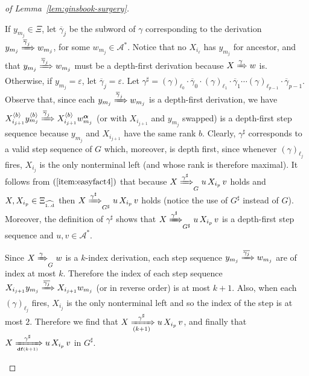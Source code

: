 \documentclass[final]{llncs}
\def\tuple#1{{\langle #1 \rangle}}
\def\df#1{\scriptscriptstyle\mathbf{df}(#1)}
\def\Vars{\ensuremath{\Xi}}
\def\Varse{\ensuremath{\Xi_{\widehat{\text{\tiny 1..d}}}}}
\begin{document}
\begin{proof}[of Lemma~\ref{lem:ginsbook-surgery}]
\begin{compactenum}[1.]
  If $y_{m_j} \in \Vars$, let $\overline{\gamma}_j$ be the subword of
  $\gamma$ corresponding to the derivation $y_{m_j}
  \xRightarrow{\overline{\gamma}_j} w_{m_j}$, for some $w_{m_j} \in
	\mathcal{A}^* $. Notice that no \(X_{i_{\ell}}\) has $y_{m_j}$ for ancestor, and that $y_{m_j}
  \xRightarrow{\overline{\gamma}_j} w_{m_j}$ must be a depth-first
	derivation because $X \xRightarrow{\gamma} w$ is. Otherwise, if $y_{m_j} =
	\varepsilon$, let $\overline{\gamma}_j = \varepsilon$. Let $\gamma^\sharp =
	(\gamma)_{\ell_0} \cdot \overline{\gamma}_0 \cdot
  (\gamma)_{\ell_1} \cdot \overline{\gamma}_1 \cdots
  (\gamma)_{\ell_{p{-}1}} \cdot \overline{\gamma}_{p{-}1}$. Observe
  that, since each $y_{m_j} \xRightarrow{\overline{\gamma}_j} w_{m_j}$
  is a depth-first derivation, we have $X_{i_{j+1}}^{\tuple{b}}
  y_{m_j}^{\tuple{b}} \xRightarrow{\overline{\gamma}_j}
  X_{i_{j+1}}^{\tuple{b}} w_{m_j}^{\boldsymbol{\alpha}}$ (or with
  \(X_{i_{j+1}}\) and \(y_{m_j}\) swapped) is a depth-first step
  sequence because \( y_{m_j} \) and \( X_{i_{j+1}} \) have the same
  rank \(b\).  Clearly, $\gamma^\sharp$ corresponds to a valid
  step sequence of $G$ which, moreover, is depth first, since whenever
  $ (\gamma)_{\ell_j} $ fires, \(X_{i_j}\) is the only nonterminal left
  (and whose rank is therefore maximal). It follows from \(
  (\ref{item:easyfact4})\) that because \(X
  \xRightarrow{\gamma^\sharp}_G u \, X_{i_p} \, v\) holds and
  \(X, X_{i_p}\in \Varse\) then \(X
  \xRightarrow{\gamma^\sharp}_{G^\sharp} u \, X_{i_p} \, v\)
  holds (notice the use of \(G^\sharp\) instead of \(G\)).  Moreover,
  the definition of \(\gamma^\sharp\) shows that $X
  \xRightarrow{\gamma^\sharp}_{G^\sharp} u \, X_{i_p} \, v$ is a
  depth-first step sequence and $u, v \in \mathcal{A}^* $.

  Since $X \xRightarrow{\gamma}_G w$ is a $k$-index derivation, each
  step sequence \(y_{m_j} \xRightarrow{\overline{\gamma_j}} w_{m_j}\)
  are of index at most $k$.  Therefore the index of each step sequence
  \(X_{i_{j+1}} y_{m_j} \xRightarrow{\overline{\gamma_j}} X_{i_{j+1}}
  w_{m_j}\) (or in reverse order) is at most \(k+1\). Also, when each
  $ (\gamma)_{\ell_j} $ fires, \(X_{i_j}\) is the only nonterminal left
  and so the index of the step is at most $2$. Therefore we find that
  \(X \xRightarrow[(k+1)]{\gamma^\sharp} u \, X_{i_p} \, v\),
  and finally that \( X \xRightarrow[\df{k+1}]{\gamma^\sharp} u\,
  X_{i_p}\, v\) in $G^\sharp$.
  

\end{compactenum}
\end{proof}
\end{document}
